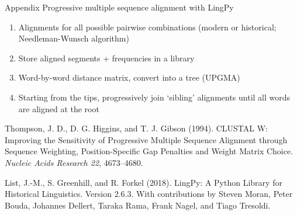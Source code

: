 \documentclass[xcolor={dvipsnames}]{beamer}
\begin{document}
\begin{frame}{Appendix}
Progressive multiple sequence alignment with LingPy
\begin{enumerate}
    \item Alignments for all possible pairwise combinations (modern or historical; Needleman-Wunsch algorithm)
    \item Store aligned segments + frequencies in a library
    \item Word-by-word distance matrix, convert into a tree (UPGMA)
    \item Starting from the tips, progressively join `sibling' alignments until all words are aligned at the root
\end{enumerate}

{\small
Thompson, J. D., D. G. Higgins, and T. J. Gibson (1994). CLUSTAL W: Improving the Sensitivity
of Progressive Multiple Sequence Alignment through Sequence Weighting, Position-Specific
Gap Penalties and Weight Matrix Choice. \textit{Nucleic Acids Research 22}, 4673–4680.

List, J.-M., S. Greenhill, and R. Forkel (2018). LingPy: A Python Library for
Historical Linguistics. Version 2.6.3. With contributions by Steven Moran, Peter
Bouda, Johannes Dellert, Taraka Rama, Frank Nagel, and Tiago Tresoldi.
}
\end{frame}
\end{document}
